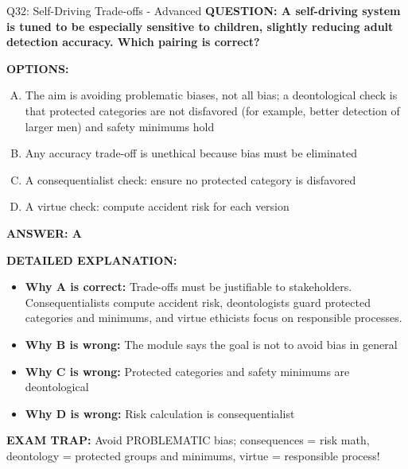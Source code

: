 \documentclass[8pt]{beamer}
\begin{document}
\begin{frame}[shrink=6]{Q32: Self-Driving Trade-offs - Advanced}
\fontsize{6.5}{7.5}\selectfont
\textbf{QUESTION: A self-driving system is tuned to be especially sensitive to children, slightly reducing adult detection accuracy. Which pairing is correct?}

\vspace{0.1cm}
\textbf{OPTIONS:}
\begin{enumerate}[A.]
\item The aim is avoiding problematic biases, not all bias; a deontological check is that protected categories are not disfavored (for example, better detection of larger men) and safety minimums hold
\item Any accuracy trade-off is unethical because bias must be eliminated
\item A consequentialist check: ensure no protected category is disfavored
\item A virtue check: compute accident risk for each version
\end{enumerate}

\vspace{0.1cm}
\textcolor{myblue}{\textbf{ANSWER: A}}

\vspace{0.1cm}
\textbf{DETAILED EXPLANATION:}
\begin{itemize}
\item \textbf{Why A is correct:} Trade-offs must be justifiable to stakeholders. Consequentialists compute accident risk, deontologists guard protected categories and minimums, and virtue ethicists focus on responsible processes.
\item \textbf{Why B is wrong:} The module says the goal is not to avoid bias in general
\item \textbf{Why C is wrong:} Protected categories and safety minimums are deontological
\item \textbf{Why D is wrong:} Risk calculation is consequentialist
\end{itemize}

\textcolor{myred}{\textbf{EXAM TRAP:}} Avoid PROBLEMATIC bias; consequences = risk math, deontology = protected groups and minimums, virtue = responsible process!
\end{frame}
\end{document}
